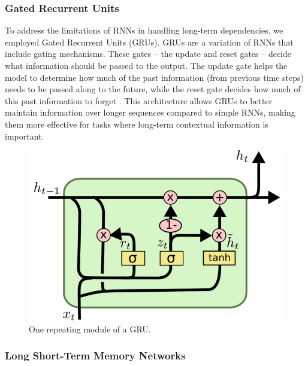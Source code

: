 \documentclass{article}
\begin{document}
\subsubsection{Gated Recurrent Units}

To address the limitations of RNNs in handling long-term dependencies, we employed Gated Recurrent Units (GRUs). GRUs are a variation of RNNs that include gating mechanisms. These gates – the update and reset gates – decide what information should be passed to the output. The update gate helps the model to determine how much of the past information (from previous time steps) needs to be passed along to the future, while the reset gate decides how much of this past information to forget \cite{Jabreel}. This architecture allows GRUs to better maintain information over longer sequences compared to simple RNNs, making them more effective for tasks where long-term contextual information is important.

\begin{figure}[ht]
\vskip 0.2in
\begin{center}
\centerline{\includegraphics[width=\columnwidth]{ML_images/GRUs.png}}
\caption{One repeating module of a GRU.}
\label{GRU}
\end{center}
\vskip -0.2in
\end{figure}

\subsubsection{Long Short-Term Memory Networks}
\end{document}
